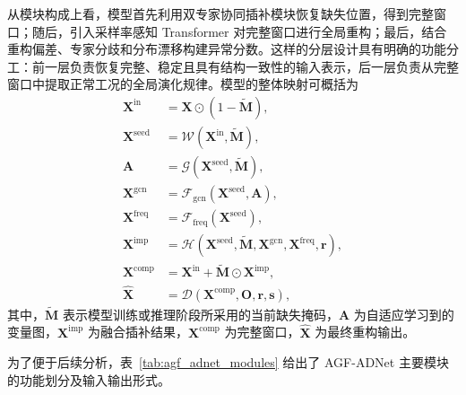 从模块构成上看，模型首先利用双专家协同插补模块恢复缺失位置，得到完整窗口；随后，引入采样率感知 Transformer 对完整窗口进行全局重构；最后，结合重构偏差、专家分歧和分布漂移构建异常分数。这样的分层设计具有明确的功能分工：前一层负责恢复完整、稳定且具有结构一致性的输入表示，后一层负责从完整窗口中提取正常工况的全局演化规律。模型的整体映射可概括为
\begin{align}
    \mathbf{X}^{\mathrm{in}} &= \mathbf{X} \odot (1-\widetilde{\mathbf{M}}), \\
    \mathbf{X}^{\mathrm{seed}} &= \mathcal{W}\!\left(\mathbf{X}^{\mathrm{in}}, \widetilde{\mathbf{M}}\right), \\
    \mathbf{A} &= \mathcal{G}\!\left(\mathbf{X}^{\mathrm{seed}}, \widetilde{\mathbf{M}}\right), \\
    \mathbf{X}^{\mathrm{gcn}} &= \mathcal{F}_{\mathrm{gcn}}\!\left(\mathbf{X}^{\mathrm{seed}}, \mathbf{A}\right), \\
    \mathbf{X}^{\mathrm{freq}} &= \mathcal{F}_{\mathrm{freq}}\!\left(\mathbf{X}^{\mathrm{seed}}\right), \\
    \mathbf{X}^{\mathrm{imp}} &= \mathcal{H}\!\left(\mathbf{X}^{\mathrm{seed}}, \widetilde{\mathbf{M}}, \mathbf{X}^{\mathrm{gcn}}, \mathbf{X}^{\mathrm{freq}}, \mathbf{r}\right), \\
    \mathbf{X}^{\mathrm{comp}} &= \mathbf{X}^{\mathrm{in}} + \widetilde{\mathbf{M}} \odot \mathbf{X}^{\mathrm{imp}}, \\
    \hat{\mathbf{X}} &= \mathcal{D}\!\left(\mathbf{X}^{\mathrm{comp}}, \mathbf{O}, \mathbf{r}, \mathbf{s}\right),
\end{align}
其中，$\widetilde{\mathbf{M}}$ 表示模型训练或推理阶段所采用的当前缺失掩码，$\mathbf{A}$ 为自适应学习到的变量图，$\mathbf{X}^{\mathrm{imp}}$ 为融合插补结果，$\mathbf{X}^{\mathrm{comp}}$ 为完整窗口，$\hat{\mathbf{X}}$ 为最终重构输出。

为了便于后续分析，表~\ref{tab:agf_adnet_modules} 给出了 AGF-ADNet 主要模块的功能划分及输入输出形式。

